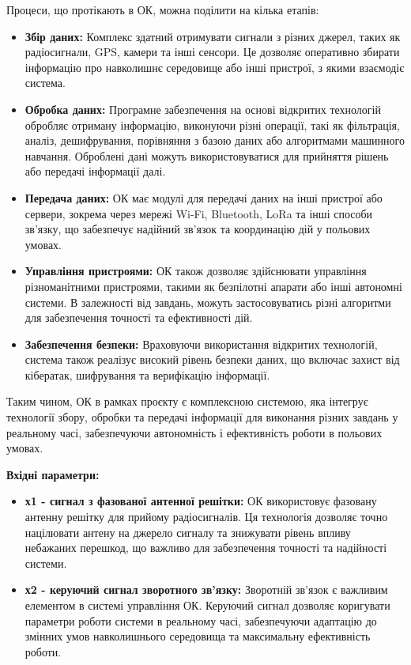\documentclass[a4paper]{article}
\begin{document}
Процеси, що протікають в ОК, можна поділити на кілька етапів:

\begin{itemize}
    \item \textbf{Збір даних:} Комплекс здатний отримувати сигнали з різних джерел, таких як радіосигнали, GPS, камери та інші сенсори. Це дозволяє оперативно збирати інформацію про навколишнє середовище або інші пристрої, з якими взаємодіє система.
    \item \textbf{Обробка даних:} Програмне забезпечення на основі відкритих технологій обробляє отриману інформацію, виконуючи різні операції, такі як фільтрація, аналіз, дешифрування, порівняння з базою даних або алгоритмами машинного навчання. Оброблені дані можуть використовуватися для прийняття рішень або передачі інформації далі.
    \item \textbf{Передача даних:} ОК має модулі для передачі даних на інші пристрої або сервери, зокрема через мережі Wi-Fi, Bluetooth, LoRa та інші способи зв'язку, що забезпечує надійний зв'язок та координацію дій у польових умовах.
    \item \textbf{Управління пристроями:} ОК також дозволяє здійснювати управління різноманітними пристроями, такими як безпілотні апарати або інші автономні системи. В залежності від завдань, можуть застосовуватись різні алгоритми для забезпечення точності та ефективності дій.
    \item \textbf{Забезпечення безпеки:} Враховуючи використання відкритих технологій, система також реалізує високий рівень безпеки даних, що включає захист від кібератак, шифрування та верифікацію інформації.
\end{itemize}

Таким чином, ОК в рамках проєкту є комплексною системою, яка інтегрує технології збору, обробки та передачі інформації для виконання різних завдань у реальному часі, забезпечуючи автономність і ефективність роботи в польових умовах.


\textbf{Вхідні параметри:}


\begin{itemize}
    \item \textbf{х1 - сигнал з фазованої антенної решітки:} ОК використовує фазовану антенну решітку для прийому радіосигналів. Ця технологія дозволяє точно націлювати антену на джерело сигналу та знижувати рівень впливу небажаних перешкод, що важливо для забезпечення точності та надійності системи.
    \item \textbf{х2 - керуючий сигнал зворотного зв'язку:} Зворотній зв'язок є важливим елементом в системі управління ОК. Керуючий сигнал дозволяє коригувати параметри роботи системи в реальному часі, забезпечуючи адаптацію до змінних умов навколишнього середовища та максимальну ефективність роботи.
\end{itemize}
\end{document}
